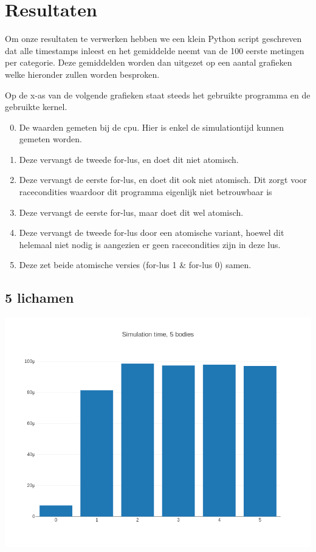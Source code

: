 \documentclass{article}
\begin{document}

\section{Resultaten}
Om onze resultaten te verwerken hebben we een klein Python script geschreven dat
alle timestamps inleest en het gemiddelde neemt van de 100 eerste metingen per
categorie. Deze gemiddelden worden dan uitgezet op een aantal grafieken welke
hieronder zullen worden besproken.

Op de x-as van de volgende grafieken staat steeds het gebruikte programma en 
de gebruikte kernel. 
\begin{enumerate}
 \setcounter{enumi}{-1} 
 \item De waarden gemeten bij de cpu. Hier is enkel de simulationtijd kunnen gemeten worden.
 \item Deze vervangt de tweede for-lus, en doet dit niet atomisch.
 \item Deze vervangt de eerste for-lus, en doet dit ook niet atomisch. Dit zorgt voor
 racecondities waardoor dit programma eigenlijk niet betrouwbaar is
 \item Deze vervangt de eerste for-lus, maar doet dit wel atomisch. 
 \item Deze vervangt de tweede for-lus door een atomische variant, hoewel dit helemaal niet 
 nodig is aangezien er geen racecondities zijn in deze lus.
 \item Deze zet beide atomische versies (for-lus 1 \& for-lus 0) samen.
 \end{enumerate}


\subsection{5 lichamen}
\includegraphics[width=\textwidth]{grafiekskes/hist_simulation5.png}
\end{document}
